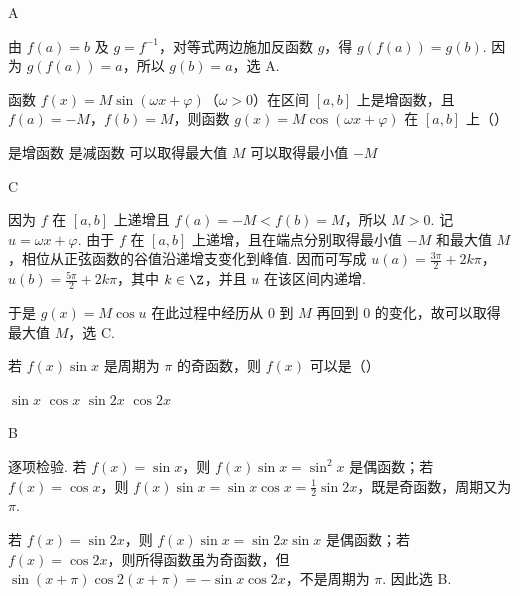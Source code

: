 \begin{answer}
A
\end{answer}

\begin{solution}
由 \(f(a)=b\) 及 \(g=f^{-1}\)，对等式两边施加反函数 \(g\)，得
\(g(f(a))=g(b)\). 因为 \(g(f(a))=a\)，所以 \(g(b)=a\)，选 A.
\end{solution}

\begin{problem}
函数 \(f(x) = M \sin (\omega x + \varphi)\)（\(\omega > 0\)）在区间 \([a, b]\) 上是增函数，且 \(f(a) = -M\)，\(f(b) = M\)，则函数 \(g(x) = M \cos (\omega x + \varphi)\) 在 \([a, b]\) 上（\quad）

\choices
    {是增函数}
    {是减函数}
    {可以取得最大值 \(M\)}
    {可以取得最小值 \(-M\)}
\end{problem}

\begin{answer}
C
\end{answer}

\begin{solution}
因为 \(f\) 在 \([a,b]\) 上递增且 \(f(a)=-M<f(b)=M\)，所以 \(M>0\). 记 \(u=\omega x+\varphi\). 由于 \(f\) 在 \([a,b]\) 上递增，且在端点分别取得最小值 \(-M\) 和最大值 \(M\)，相位从正弦函数的谷值沿递增支变化到峰值. 因而可写成
\(u(a)=\frac{3\pi}{2}+2k\pi\)，\(u(b)=\frac{5\pi}{2}+2k\pi\)，其中 \(k\in\Z\)，并且 \(u\) 在该区间内递增.

于是 \(g(x)=M\cos u\) 在此过程中经历从 \(0\) 到 \(M\) 再回到 \(0\) 的变化，故可以取得最大值 \(M\)，选 C.
\end{solution}

\begin{problem}
若 \(f(x) \sin x \) 是周期为 \(\pi \) 的奇函数，则 \(f(x) \) 可以是（\quad）

\choices
    {\(\sin x\)}
    {\(\cos x\)}
    {\(\sin 2x\)}
    {\(\cos 2x\)}
\end{problem}

\begin{answer}
B
\end{answer}

\begin{solution}
逐项检验. 若 \(f(x)=\sin x\)，则 \(f(x)\sin x=\sin^2x\) 是偶函数；若 \(f(x)=\cos x\)，则
\(f(x)\sin x=\sin x\cos x=\frac12\sin2x\)，既是奇函数，周期又为 \(\pi\).

若 \(f(x)=\sin2x\)，则 \(f(x)\sin x=\sin2x\sin x\) 是偶函数；若 \(f(x)=\cos2x\)，则所得函数虽为奇函数，但
\(\sin(x+\pi)\cos2(x+\pi)=-\sin x\cos2x\)，不是周期为 \(\pi\). 因此选 B.
\end{solution}

